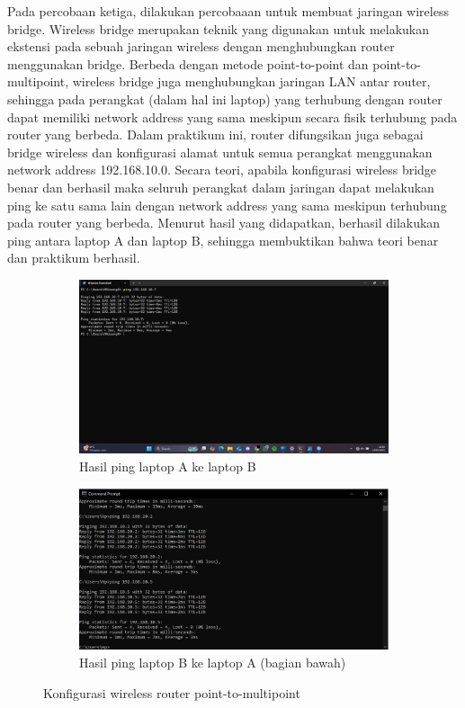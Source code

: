Pada percobaan ketiga, dilakukan percobaaan untuk membuat jaringan wireless bridge. Wireless bridge merupakan teknik yang digunakan untuk melakukan ekstensi pada sebuah jaringan wireless dengan menghubungkan router menggunakan bridge. Berbeda dengan metode point-to-point dan point-to-multipoint, wireless bridge juga menghubungkan jaringan LAN antar router, sehingga pada perangkat (dalam hal ini laptop) yang terhubung dengan router dapat memiliki network address yang sama meskipun secara fisik terhubung pada router yang berbeda. Dalam praktikum ini, router difungsikan juga sebagai bridge wireless dan konfigurasi alamat untuk semua perangkat menggunakan network address 192.168.10.0. Secara teori, apabila konfigurasi wireless bridge benar dan berhasil maka seluruh perangkat dalam jaringan dapat melakukan ping ke satu sama lain dengan network address yang sama meskipun terhubung pada router yang berbeda. Menurut hasil yang didapatkan, berhasil dilakukan ping antara laptop A dan laptop B, sehingga membuktikan bahwa teori benar dan praktikum berhasil.
\begin{figure}[H]
	\centering
	\begin{subfigure}[b]{0.4\linewidth}
		\centering
		\includegraphics[width=\linewidth]{P3/img/wb ping a.jpg}
		\caption{Hasil ping laptop A ke laptop B\label{fig:konfigurasiR1}}
	\end{subfigure}
	\begin{subfigure}[b]{0.4\linewidth}
		\centering
		\includegraphics[width=\linewidth]{P3/img/ptp wb ping b.jpg}
		\caption{Hasil ping laptop B ke laptop A (bagian bawah)\label{fig:konfigurasiR2}}
	\end{subfigure}
	\caption{Konfigurasi wireless router point-to-multipoint}
	\hspace{1cm}
\end{figure}

